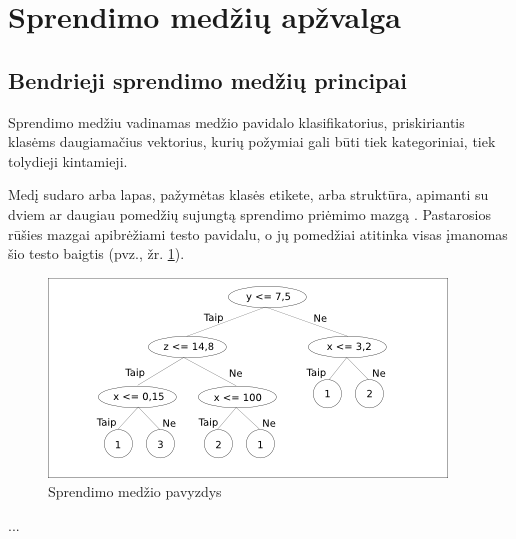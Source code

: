 \section{Sprendimo medžių apžvalga}
\label{sec:Sprendimo medziu apzvalga}

\subsection{Bendrieji sprendimo medžių principai}

Sprendimo medžiu vadinamas medžio pavidalo klasifikatorius, priskiriantis klasėms daugiamačius vektorius, kurių požymiai gali būti tiek kategoriniai, tiek tolydieji kintamieji. %

Medį sudaro arba lapas, pažymėtas klasės etikete, arba struktūra, apimanti su dviem ar daugiau pomedžių sujungtą sprendimo priėmimo mazgą \cite{DBLP:dblp_journals/csur/Quinlan96}. Pastarosios rūšies mazgai apibrėžiami testo pavidalu, o jų pomedžiai atitinka visas įmanomas šio testo baigtis (pvz., žr. \ref{fig:DT}).
\begin{figure}[H]
  \centering
    \includegraphics{skyriai/paveiksliukai/sm_pvz}
  \caption{Sprendimo medžio pavyzdys\label{fig:DT}}
\end{figure}

...
